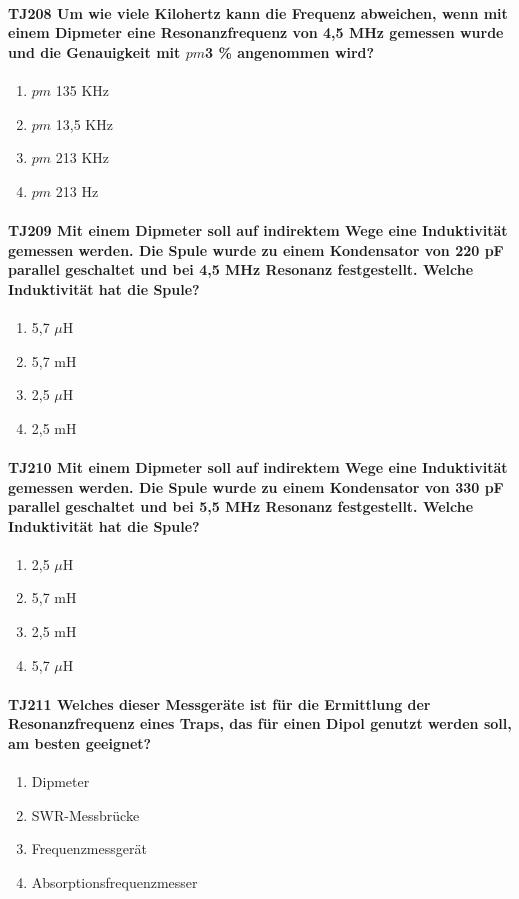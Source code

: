 \documentclass[8pt]{article}
\begin{document}
\paragraph*{TJ208 Um wie viele Kilohertz kann die Frequenz abweichen, wenn mit einem Dipmeter eine Resonanzfrequenz von 4,5 MHz gemessen wurde und die Genauigkeit mit $pm$3 \% angenommen wird?}
\begin{enumerate}[nolistsep,label=\Alph*]
\item $pm$ 135 KHz
\item $pm$ 13,5 KHz
\item $pm$ 213 KHz
\item $pm$ 213 Hz
\end{enumerate}

\paragraph*{TJ209 Mit einem Dipmeter soll auf indirektem Wege eine Induktivität gemessen werden. Die Spule wurde zu einem Kondensator von 220 pF parallel geschaltet und bei 4,5 MHz Resonanz festgestellt. Welche Induktivität hat die Spule?}
\begin{enumerate}[nolistsep,label=\Alph*]
\item 5,7 $\mu$H
\item 5,7 mH
\item 2,5 $\mu$H
\item 2,5 mH
\end{enumerate}

\paragraph*{TJ210 Mit einem Dipmeter soll auf indirektem Wege eine Induktivität gemessen werden. Die Spule wurde zu einem Kondensator von 330 pF parallel geschaltet und bei 5,5 MHz Resonanz festgestellt. Welche Induktivität hat die Spule?}
\begin{enumerate}[nolistsep,label=\Alph*]
\item 2,5 $\mu$H
\item 5,7 mH
\item 2,5 mH
\item 5,7 $\mu$H
\end{enumerate}

\paragraph*{TJ211 Welches dieser Messgeräte ist für die Ermittlung der Resonanzfrequenz eines Traps, das für einen Dipol genutzt werden soll, am besten geeignet?}
\begin{enumerate}[nolistsep,label=\Alph*]
\item Dipmeter
\item SWR-Messbrücke
\item Frequenzmessgerät
\item Absorptionsfrequenzmesser
\end{enumerate}
\end{document}
